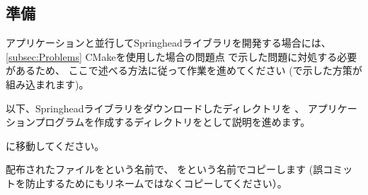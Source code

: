 \subsection{準備}
\label{subsec:PrepareApplication}

\noindent
アプリケーションと並行してSpringheadライブラリを開発する場合には、
\UpKQs \ref{subsec:Problems} CMakeを使用した場合の問題点\UpKQe
で示した問題に対処する必要があるため、
ここで述べる方法に従って作業を進めてください
(で示した方策が組み込まれます)。

\medskip
以下、Springheadライブラリをダウンロードしたディレクトリを\SprTop{} 、
アプリケーションプログラムを作成するディレクトリを\AppTop{}として説明を進めます。

\bigskip
\noindent
\AppTop{}に移動してください。

\bigskip
\noindent
配布されたファイルを\CMakeTopdir{}という名前で、
を\CMakeLists{}という名前でコピーします
(誤コミットを防止するためにもリネームではなくコピーしてください）。

\medskip
\begin{narrow}[15pt]
\end{narrow}


